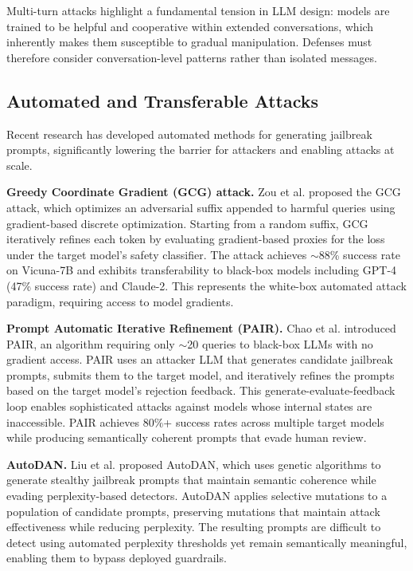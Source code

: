 \documentclass[conference]{IEEEtran}
\begin{document}
Multi-turn attacks highlight a fundamental tension in LLM design: models are trained to be helpful and cooperative within extended conversations, which inherently makes them susceptible to gradual manipulation. Defenses must therefore consider conversation-level patterns rather than isolated messages.

\subsection{Automated and Transferable Attacks}

Recent research has developed automated methods for generating jailbreak prompts, significantly lowering the barrier for attackers and enabling attacks at scale.

\textbf{Greedy Coordinate Gradient (GCG) attack.} Zou et al. \cite{zou2023universal} proposed the GCG attack, which optimizes an adversarial suffix appended to harmful queries using gradient-based discrete optimization. Starting from a random suffix, GCG iteratively refines each token by evaluating gradient-based proxies for the loss under the target model's safety classifier. The attack achieves $\sim$88\% success rate on Vicuna-7B and exhibits transferability to black-box models including GPT-4 (47\% success rate) and Claude-2. This represents the white-box automated attack paradigm, requiring access to model gradients.

\textbf{Prompt Automatic Iterative Refinement (PAIR).} Chao et al. \cite{chao2023jailbreaking} introduced PAIR, an algorithm requiring only $\sim$20 queries to black-box LLMs with no gradient access. PAIR uses an attacker LLM that generates candidate jailbreak prompts, submits them to the target model, and iteratively refines the prompts based on the target model's rejection feedback. This generate-evaluate-feedback loop enables sophisticated attacks against models whose internal states are inaccessible. PAIR achieves 80\%+ success rates across multiple target models while producing semantically coherent prompts that evade human review.

\textbf{AutoDAN.} Liu et al. \cite{liu2024autodan} proposed AutoDAN, which uses genetic algorithms to generate stealthy jailbreak prompts that maintain semantic coherence while evading perplexity-based detectors. AutoDAN applies selective mutations to a population of candidate prompts, preserving mutations that maintain attack effectiveness while reducing perplexity. The resulting prompts are difficult to detect using automated perplexity thresholds yet remain semantically meaningful, enabling them to bypass deployed guardrails.
\end{document}
